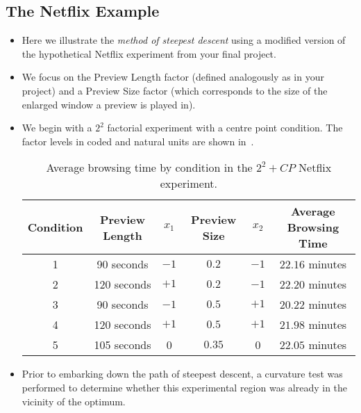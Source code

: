 \subsection{The Netflix Example}
\begin{itemize}
      \item Here we illustrate the \emph{method of steepest descent} using a modified version of the hypothetical Netflix
            experiment from your final project.
      \item We focus on the Preview Length factor (defined analogously as in your project) and a Preview Size
            factor (which corresponds to the size of the enlarged window a preview is played in).
      \item We begin with a $2^2$ factorial experiment with a centre point condition. The factor levels in coded and
            natural units are shown in~.
            \begin{table}[!htbp]
                  \centering
                  \caption{Average browsing time by condition in the $2^2 + CP$ Netflix experiment.}\label{tab:netflixtab1}
                  \begin{tabular}{cccccc}
                        \toprule Condition & Preview Length & $x_{1}$ & Preview Size & $x_{2}$ & Average Browsing Time \\
                        \midrule 1         & 90 seconds     & $-1$    & $0.2$        & $-1$    & $22.16$ minutes       \\
                        2                  & 120 seconds    & $+1$    & $0.2$        & $-1$    & $22.20$ minutes       \\
                        3                  & 90 seconds     & $-1$    & $0.5$        & $+1$    & $20.22$ minutes       \\
                        4                  & 120 seconds    & $+1$    & $0.5$        & $+1$    & $21.98$ minutes       \\
                        5                  & 105 seconds    & 0       & $0.35$       & 0       & $22.05$ minutes       \\
                        \bottomrule
                  \end{tabular}
            \end{table}
      \item Prior to embarking down the path of steepest descent, a curvature test was performed to determine
            whether this experimental region was already in the vicinity of the optimum.

\end{itemize}
